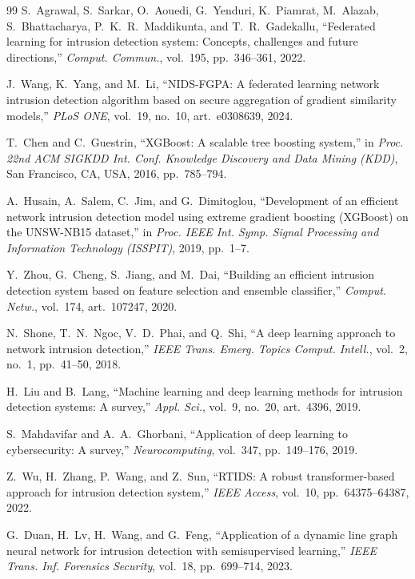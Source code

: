 \documentclass[11pt,a4paper]{article}
\begin{document}
\begin{thebibliography}{99}
 S.~Agrawal, S.~Sarkar, O.~Aouedi, G.~Yenduri, K.~Piamrat,
M.~Alazab, S.~Bhattacharya, P.~K.~R.~Maddikunta, and T.~R.~Gadekallu,
``Federated learning for intrusion detection system: Concepts, challenges and
future directions,'' \emph{Comput. Commun.}, vol.~195, pp.~346--361, 2022.

 J.~Wang, K.~Yang, and M.~Li, ``NIDS-FGPA: A federated learning
network intrusion detection algorithm based on secure aggregation of gradient
similarity models,'' \emph{PLoS ONE}, vol.~19, no.~10, art.~e0308639, 2024.

 T.~Chen and C.~Guestrin, ``XGBoost: A scalable tree boosting
system,'' in \emph{Proc. 22nd ACM SIGKDD Int. Conf. Knowledge Discovery and
Data Mining (KDD)}, San Francisco, CA, USA, 2016, pp.~785--794.

 A.~Husain, A.~Salem, C.~Jim, and G.~Dimitoglou, ``Development
of an efficient network intrusion detection model using extreme gradient
boosting (XGBoost) on the UNSW-NB15 dataset,'' in \emph{Proc. IEEE Int. Symp.
Signal Processing and Information Technology (ISSPIT)}, 2019, pp.~1--7.

 Y.~Zhou, G.~Cheng, S.~Jiang, and M.~Dai, ``Building an efficient
intrusion detection system based on feature selection and ensemble classifier,''
\emph{Comput. Netw.}, vol.~174, art.~107247, 2020.

 N.~Shone, T.~N.~Ngoc, V.~D.~Phai, and Q.~Shi, ``A deep learning
approach to network intrusion detection,'' \emph{IEEE Trans. Emerg. Topics
Comput. Intell.}, vol.~2, no.~1, pp.~41--50, 2018.

 H.~Liu and B.~Lang, ``Machine learning and deep learning
methods for intrusion detection systems: A survey,'' \emph{Appl. Sci.}, vol.~9,
no.~20, art.~4396, 2019.

 S.~Mahdavifar and A.~A.~Ghorbani, ``Application of deep
learning to cybersecurity: A survey,'' \emph{Neurocomputing}, vol.~347,
pp.~149--176, 2019.

 Z.~Wu, H.~Zhang, P.~Wang, and Z.~Sun, ``RTIDS: A robust
transformer-based approach for intrusion detection system,'' \emph{IEEE Access},
vol.~10, pp.~64375--64387, 2022.

 G.~Duan, H.~Lv, H.~Wang, and G.~Feng, ``Application of a dynamic
line graph neural network for intrusion detection with semisupervised
learning,'' \emph{IEEE Trans. Inf. Forensics Security}, vol.~18, pp.~699--714,
2023.


\end{thebibliography}
\end{document}
